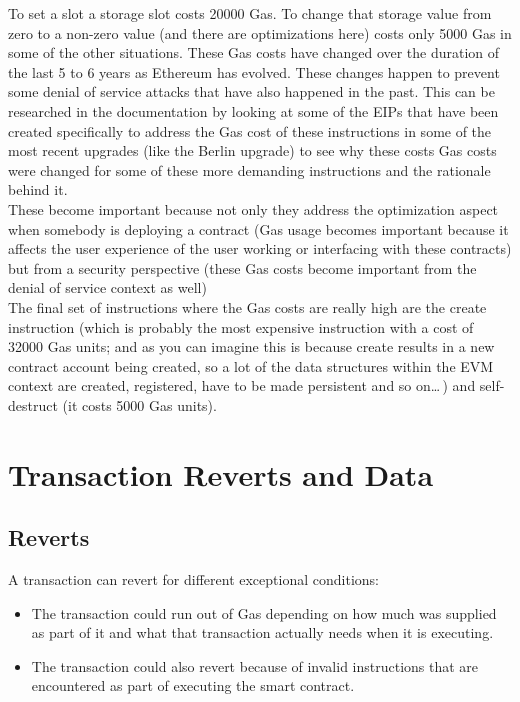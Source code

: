 To set a slot a storage slot costs 20000 Gas.
To change that storage value from zero to a non-zero value (and there are optimizations here) costs only 5000 Gas in some of the other situations.
These Gas costs have changed over the duration of the last 5 to 6 years as Ethereum has evolved.
These changes happen to prevent some denial of service attacks that have also happened in the past.
This can be researched in the documentation by looking at some of the EIPs that have been created specifically to address the Gas cost of these instructions in some of the most recent upgrades (like the Berlin upgrade) to see why these costs Gas costs were changed for some of these more demanding instructions and the rationale behind it.\\

These become important because not only they address the optimization aspect when somebody is deploying a contract (Gas usage becomes important because it affects the user experience of the user working or interfacing with these contracts) but from a security perspective (these Gas costs become important from the denial of service context as well)\\

The final set of instructions where the Gas costs are really high are the create instruction (which is probably the most expensive instruction with a cost of 32000 Gas units; and as you can imagine this is because create results in a new contract account being created, so a lot of the data structures within the EVM context are created, registered, have to be made persistent and so on\dots\,) and self-destruct (it costs 5000 Gas units).\\

\section{Transaction Reverts and Data}

\subsection*{Reverts}

A transaction can revert for different exceptional conditions:

\begin{itemize}
    
    \item The transaction could run out of Gas depending on how much was supplied as part of it and what that transaction actually needs when it is executing.

    \item The transaction could also revert because of invalid instructions that are encountered as part of executing the smart contract.

\end{itemize}

